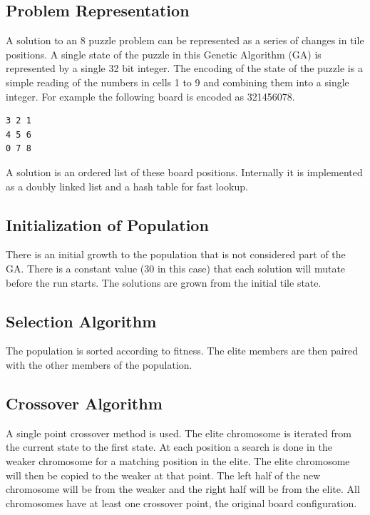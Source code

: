 \documentclass[]{article}
\begin{document}
\subsection{Problem Representation}\label{problem-representation}

A solution to an 8 puzzle problem can be represented as a series of
changes in tile positions. A single state of the puzzle in this Genetic
Algorithm (GA) is represented by a single 32 bit integer. The encoding
of the state of the puzzle is a simple reading of the numbers in cells 1
to 9 and combining them into a single integer. For example the following
board is encoded as 321456078.

\begin{verbatim}
3 2 1
4 5 6
0 7 8
\end{verbatim}

A solution is an ordered list of these board positions. Internally it is
implemented as a doubly linked list and a hash table for fast lookup.

\subsection{Initialization of
Population}\label{initialization-of-population}

There is an initial growth to the population that is not considered part
of the GA. There is a constant value (30 in this case) that each
solution will mutate before the run starts. The solutions are grown from
the initial tile state.

\subsection{Selection Algorithm}\label{selection-algorithm}

The population is sorted according to fitness. The elite members are
then paired with the other members of the population.

\subsection{Crossover Algorithm}\label{crossover-algorithm}

A single point crossover method is used. The elite chromosome is
iterated from the current state to the first state. At each position a
search is done in the weaker chromosome for a matching position in the
elite. The elite chromosome will then be copied to the weaker at that
point. The left half of the new chromosome will be from the weaker and
the right half will be from the elite. All chromosomes have at least one
crossover point, the original board configuration.
\end{document}
